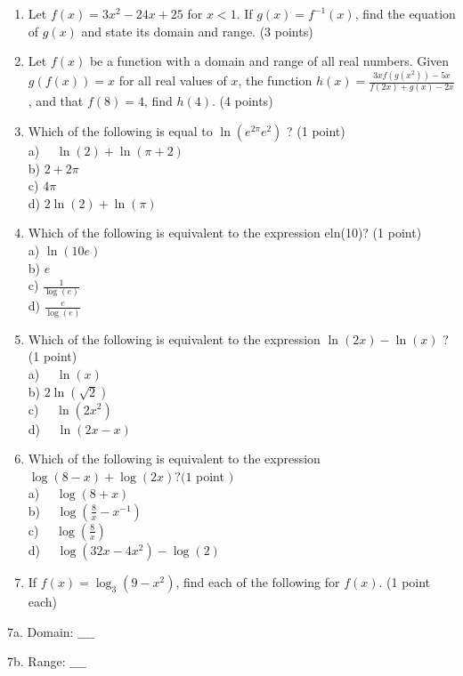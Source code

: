 \documentclass[10pt]{article}
\begin{document}
\begin{enumerate}
  \item Let $f(x)=3 x^{2}-24 x+25$ for $x<1$. If $g(x)=f^{-1}(x)$, find the equation of $g(x)$ and state its domain and range. (3 points)
  \item Let $f(x)$ be a function with a domain and range of all real numbers. Given $g(f(x))=x$ for all real values of $x$, the function $h(x)=\frac{3 x f\left(g\left(x^{2}\right)\right)-5 x}{f(2 x)+g(x)-2 x}$, and that $f(8)=4$, find $h(4)$. (4 points)
  \item Which of the following is equal to $\ln \left(e^{2 \pi} e^{2}\right)$ ? (1 point)\\
a) $\quad \ln (2)+\ln (\pi+2)$\\
b) $2+2 \pi$\\
c) $4 \pi$\\
d) $2 \ln (2)+\ln (\pi)$
  \item Which of the following is equivalent to the expression eln(10)? (1 point)\\
a) $\ln (10 e)$\\
b) $e$\\
c) $\frac{1}{\log (e)}$\\
d) $\frac{e}{\log (e)}$
  \item Which of the following is equivalent to the expression $\ln (2 x)-\ln (x)$ ? (1 point)\\
a) $\quad \ln (x)$\\
b) $2 \ln (\sqrt{2})$\\
c) $\quad \ln \left(2 x^{2}\right)$\\
d) $\quad \ln (2 x-x)$
  \item Which of the following is equivalent to the expression $\log (8-x)+\log (2 x) ?(1$ point $)$\\
a) $\quad \log (8+x)$\\
b) $\quad \log \left(\frac{8}{x}-x^{-1}\right)$\\
c) $\quad \log \left(\frac{8}{x}\right)$\\
d) $\quad \log \left(32 x-4 x^{2}\right)-\log (2)$
  \item If $f(x)=\log _{3}\left(9-x^{2}\right)$, find each of the following for $f(x)$. (1 point each)
\end{enumerate}

7a. Domain: $\_\_\_\_$

7b. Range: $\_\_\_\_$
\end{document}
